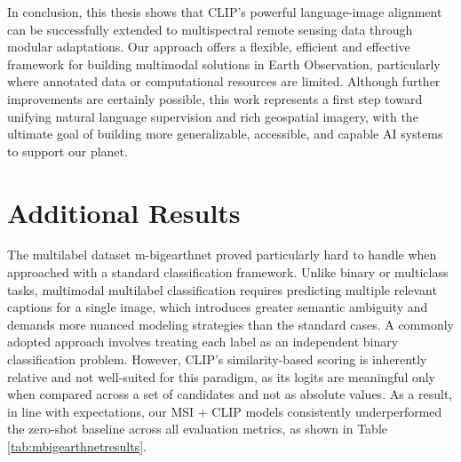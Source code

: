 \documentclass[a4paper, twoside, english]{sapthesis} %
\begin{document}
In conclusion, this thesis shows that CLIP's powerful language-image alignment can be successfully extended to multispectral remote sensing data through modular adaptations. Our approach offers a flexible, efficient and effective framework for building multimodal solutions in Earth Observation, particularly where annotated data or computational resources are limited. Although further improvements are certainly possible, this work represents a first step toward unifying natural language supervision and rich geospatial imagery, with the ultimate goal of building more generalizable, accessible, and capable AI systems to support our planet.



\cleardoublepage

\appendix
\chapter{Additional Results}\label{sec:appendix}

The multilabel dataset m-bigearthnet proved particularly hard to handle when approached with a standard classification framework. Unlike binary or multiclass tasks, multimodal multilabel classification requires predicting multiple relevant captions for a single image, which introduces greater semantic ambiguity and demands more nuanced modeling strategies than the standard cases. A commonly adopted approach involves treating each label as an independent binary classification problem. However, CLIP’s similarity-based scoring is inherently relative and not well-suited for this paradigm, as its logits are meaningful only when compared across a set of candidates and not as absolute values. As a result, in line with expectations, our MSI + CLIP models consistently underperformed the zero-shot baseline across all evaluation metrics, as shown in Table \ref{tab:mbigearthnetresults}.

\vspace{0.5cm}
\end{document}
